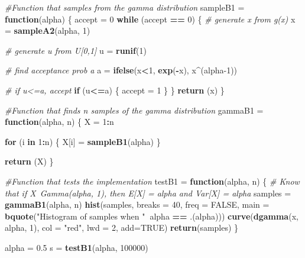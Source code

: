 \documentclass[
]{article}
\newenvironment{Shaded}{\begin{snugshade}}{\end{snugshade}}
\newcommand{\CommentTok}[1]{\textcolor[rgb]{0.56,0.35,0.01}{\textit{#1}}}
\newcommand{\ControlFlowTok}[1]{\textcolor[rgb]{0.13,0.29,0.53}{\textbf{#1}}}
\newcommand{\DataTypeTok}[1]{\textcolor[rgb]{0.13,0.29,0.53}{#1}}
\newcommand{\DecValTok}[1]{\textcolor[rgb]{0.00,0.00,0.81}{#1}}
\newcommand{\FloatTok}[1]{\textcolor[rgb]{0.00,0.00,0.81}{#1}}
\newcommand{\KeywordTok}[1]{\textcolor[rgb]{0.13,0.29,0.53}{\textbf{#1}}}
\newcommand{\NormalTok}[1]{#1}
\newcommand{\OperatorTok}[1]{\textcolor[rgb]{0.81,0.36,0.00}{\textbf{#1}}}
\newcommand{\OtherTok}[1]{\textcolor[rgb]{0.56,0.35,0.01}{#1}}
\newcommand{\StringTok}[1]{\textcolor[rgb]{0.31,0.60,0.02}{#1}}
\begin{document}
\begin{Shaded}
\begin{Highlighting}[]
\CommentTok{#Function that samples from the gamma distribution}
\NormalTok{sampleB1 =}\StringTok{ }\ControlFlowTok{function}\NormalTok{(alpha) \{}
\NormalTok{  accept =}\StringTok{ }\DecValTok{0}
  \ControlFlowTok{while}\NormalTok{ (accept }\OperatorTok{==}\StringTok{ }\DecValTok{0}\NormalTok{) \{}
    \CommentTok{# generate x from g(x)}
\NormalTok{    x =}\StringTok{ }\KeywordTok{sampleA2}\NormalTok{(alpha, }\DecValTok{1}\NormalTok{)}
      
    \CommentTok{# generate u from U[0,1]}
\NormalTok{    u =}\StringTok{ }\KeywordTok{runif}\NormalTok{(}\DecValTok{1}\NormalTok{)}
    
    \CommentTok{# find acceptance prob a}
\NormalTok{    a =}\StringTok{ }\KeywordTok{ifelse}\NormalTok{(x}\OperatorTok{<}\DecValTok{1}\NormalTok{, }\KeywordTok{exp}\NormalTok{(}\OperatorTok{-}\NormalTok{x), x}\OperatorTok{^}\NormalTok{(alpha}\DecValTok{-1}\NormalTok{))}
    
    \CommentTok{# if u<=a, accept   }
    \ControlFlowTok{if}\NormalTok{ (u}\OperatorTok{<=}\NormalTok{a) \{}
\NormalTok{      accept =}\StringTok{ }\DecValTok{1}
\NormalTok{    \}}
\NormalTok{  \}}
  \KeywordTok{return}\NormalTok{ (x)}
\NormalTok{\}}

\CommentTok{#Function that finds n samples of the gamma distribution}
\NormalTok{gammaB1 =}\StringTok{ }\ControlFlowTok{function}\NormalTok{(alpha, n) \{}
\NormalTok{  X =}\StringTok{ }\DecValTok{1}\OperatorTok{:}\NormalTok{n}
  
  \ControlFlowTok{for}\NormalTok{ (i }\ControlFlowTok{in} \DecValTok{1}\OperatorTok{:}\NormalTok{n) \{}
\NormalTok{    X[i] =}\StringTok{ }\KeywordTok{sampleB1}\NormalTok{(alpha)}
\NormalTok{  \}}
  
  \KeywordTok{return}\NormalTok{ (X)}
\NormalTok{\}}

\CommentTok{#Function that tests the implementation}
\NormalTok{testB1 =}\StringTok{ }\ControlFlowTok{function}\NormalTok{(alpha, n) \{}
  \CommentTok{# Know that if X~Gamma(alpha, 1), then E[X] = alpha and Var[X] = alpha}
\NormalTok{  samples =}\StringTok{ }\KeywordTok{gammaB1}\NormalTok{(alpha, n)}
  \KeywordTok{hist}\NormalTok{(samples, }\DataTypeTok{breaks =} \DecValTok{40}\NormalTok{, }\DataTypeTok{freq =} \OtherTok{FALSE}\NormalTok{, }\DataTypeTok{main =} \KeywordTok{bquote}\NormalTok{(}\StringTok{"Histogram of samples when "}\OperatorTok{~}\NormalTok{alpha }\OperatorTok{==}\StringTok{ }\NormalTok{.(alpha)))}
  \KeywordTok{curve}\NormalTok{(}\KeywordTok{dgamma}\NormalTok{(x, alpha, }\DecValTok{1}\NormalTok{), }\DataTypeTok{col =} \StringTok{"red"}\NormalTok{, }\DataTypeTok{lwd =} \DecValTok{2}\NormalTok{, }\DataTypeTok{add=}\OtherTok{TRUE}\NormalTok{)}
  \KeywordTok{return}\NormalTok{(samples)}
\NormalTok{\}}

\NormalTok{alpha =}\StringTok{ }\FloatTok{0.5}
\NormalTok{s =}\StringTok{ }\KeywordTok{testB1}\NormalTok{(alpha, }\DecValTok{100000}\NormalTok{)}
\end{Highlighting}
\end{Shaded}
\end{document}
